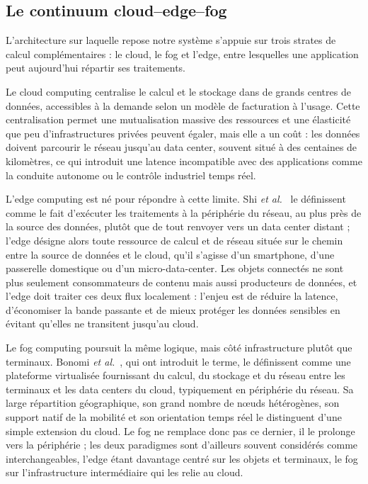 \subsection{Le continuum cloud--edge--fog}
\label{sec:continuum}
L'architecture sur laquelle repose notre système s'appuie sur trois strates de calcul complémentaires : le cloud, le fog et l'edge, entre lesquelles une application peut aujourd'hui répartir ses traitements.

Le cloud computing centralise le calcul et le stockage dans de grands centres de données, accessibles à la demande selon un modèle de facturation à l'usage. Cette centralisation permet une mutualisation massive des ressources et une élasticité que peu d'infrastructures privées peuvent égaler, mais elle a un coût : les données doivent parcourir le réseau jusqu'au data center, souvent situé à des centaines de kilomètres, ce qui introduit une latence incompatible avec des applications comme la conduite autonome ou le contrôle industriel temps réel.

L'edge computing est né pour répondre à cette limite. Shi \emph{et al.}~\cite{shi2016edge} le définissent comme le fait d'exécuter les traitements à la périphérie du réseau, au plus près de la source des données, plutôt que de tout renvoyer vers un data center distant ; l'edge désigne alors toute ressource de calcul et de réseau située sur le chemin entre la source de données et le cloud, qu'il s'agisse d'un smartphone, d'une passerelle domestique ou d'un micro-data-center. Les objets connectés ne sont plus seulement consommateurs de contenu mais aussi producteurs de données, et l'edge doit traiter ces deux flux localement : l'enjeu est de réduire la latence, d'économiser la bande passante et de mieux protéger les données sensibles en évitant qu'elles ne transitent jusqu'au cloud.

Le fog computing poursuit la même logique, mais côté infrastructure plutôt que terminaux. Bonomi \emph{et al.}~\cite{bonomi2012fog}, qui ont introduit le terme, le définissent comme une plateforme virtualisée fournissant du calcul, du stockage et du réseau entre les terminaux et les data centers du cloud, typiquement en périphérie du réseau. Sa large répartition géographique, son grand nombre de nœuds hétérogènes, son support natif de la mobilité et son orientation temps réel le distinguent d'une simple extension du cloud. Le fog ne remplace donc pas ce dernier, il le prolonge vers la périphérie ; les deux paradigmes sont d'ailleurs souvent considérés comme interchangeables, l'edge étant davantage centré sur les objets et terminaux, le fog sur l'infrastructure intermédiaire qui les relie au cloud.

